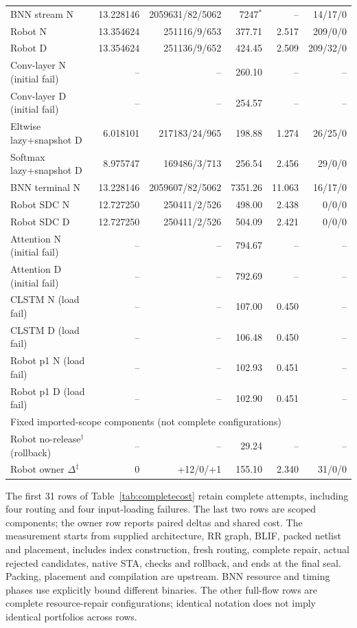 \documentclass[conference,10pt]{IEEEtran}
\begin{document}
\begin{table}[t]
\begin{tabular}{lrrrrr}
BNN stream N&13.228146&2059631/82/5062&7247$^{*}$&--&14/17/0\\
Robot N&13.354624&251116/9/653&377.71&2.517&209/0/0\\
Robot D&13.354624&251136/9/652&424.45&2.509&209/32/0\\
Conv-layer N (initial fail)&--&--&260.10&--&--\\
Conv-layer D (initial fail)&--&--&254.57&--&--\\
Eltwise lazy+snapshot D&6.018101&217183/24/965&198.88&1.274&26/25/0\\
Softmax lazy+snapshot D&8.975747&169486/3/713&256.54&2.456&29/0/0\\\hline
BNN terminal N&13.228146&2059607/82/5062&7351.26&11.063&16/17/0\\
Robot SDC N&12.727250&250411/2/526&498.00&2.438&0/0/0\\
Robot SDC D&12.727250&250411/2/526&504.09&2.421&0/0/0\\
Attention N (initial fail)&--&--&794.67&--&--\\
Attention D (initial fail)&--&--&792.69&--&--\\\hline
CLSTM N (load fail)&--&--&107.00&0.450&--\\
CLSTM D (load fail)&--&--&106.48&0.450&--\\
Robot p1 N (load fail)&--&--&102.93&0.451&--\\
Robot p1 D (load fail)&--&--&102.90&0.451&--\\\hline
\multicolumn{6}{l}{Fixed imported-scope components (not complete configurations)}\\

Robot no-release$^{\dagger}$ (rollback)&--&--&29.24&--&--\\
Robot owner $\Delta^{\ddagger}$&0&+12/0/+1&155.10&2.340&31/0/0\\\hline
\end{tabular}
\end{table}


The first 31 rows of Table~\ref{tab:completecost} retain complete attempts, including four routing and four input-loading failures. The last two rows are scoped components; the owner row reports paired deltas and shared cost. The measurement starts from supplied architecture, RR graph, BLIF, packed netlist and placement, includes index construction, fresh routing, complete repair, actual rejected candidates, native STA, checks and rollback, and ends at the final seal. Packing, placement and compilation are upstream. BNN resource and timing phases use explicitly bound different binaries. The other full-flow rows are complete resource-repair configurations; identical notation does not imply identical portfolios across rows.
\end{document}
